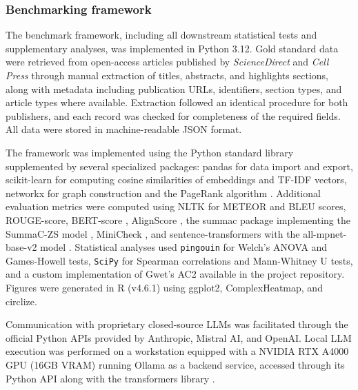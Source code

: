 \subsubsection{Benchmarking framework}

The benchmark framework, including all downstream statistical tests and supplementary analyses, was implemented in Python 3.12. Gold standard data were retrieved from open-access articles published by \textit{ScienceDirect} and \textit{Cell Press} through manual extraction of titles, abstracts, and highlights sections, along with metadata including publication URLs, identifiers, section types, and article types where available. Extraction followed an identical procedure for both publishers, and each record was checked for completeness of the required fields. All data were stored in machine-readable JSON format.

The framework was implemented using the Python standard library supplemented by several specialized packages: pandas \cite{mckinney-proc-scipy-2010} for data import and export, scikit-learn \cite{scikit-learn} for computing cosine similarities of embeddings and TF-IDF vectors, networkx \cite{hagberg2008exploring} for graph construction and the PageRank algorithm \cite{BRIN1998107}. Additional evaluation metrics were computed using NLTK \cite{bird2009natural} for METEOR and BLEU scores, ROUGE-score, BERT-score \cite{zhang2020bertscoreevaluatingtextgeneration}, AlignScore \cite{zha2023alignscoreevaluatingfactualconsistency}, the summac package implementing the SummaC-ZS model \cite{laban2021summacrevisitingnlibasedmodels}, MiniCheck \cite{tang2024minicheckefficientfactcheckingllms}, and sentence-transformers \cite{reimers2019sentencebertsentenceembeddingsusing} with the all-mpnet-base-v2 model \cite{song2020mpnetmaskedpermutedpretraining}. Statistical analyses used \texttt{pingouin} for Welch's \ac{ANOVA} and Games-Howell tests, \texttt{SciPy} for Spearman correlations and Mann-Whitney U tests, and a custom implementation of Gwet's AC2 available in the project repository. Figures were generated in R (v4.6.1) using ggplot2, ComplexHeatmap, and circlize.

Communication with proprietary closed-source LLMs was facilitated through the official Python APIs provided by Anthropic, Mistral AI, and OpenAI. Local LLM execution was performed on a workstation equipped with a NVIDIA RTX A4000 GPU (16GB VRAM) running Ollama as a backend service, accessed through its Python API along with the transformers library \cite{wolf-etal-2020-transformers}. 

